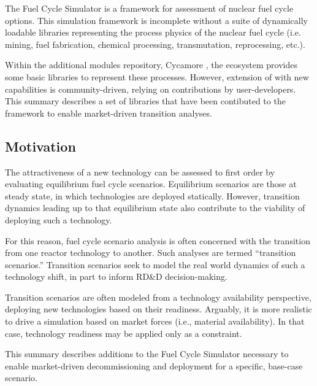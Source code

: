 
The \Cyclus Fuel Cycle Simulator \cite{carlsen_cyclus_2014} is a framework for 
assessment of nuclear fuel cycle options. This simulation framework is 
incomplete without a suite of dynamically loadable libraries representing the 
process physics of the nuclear fuel cycle (i.e. mining, fuel fabrication, 
chemical processing, transmutation, reprocessing, etc.).  

Within the additional modules repository, Cycamore 
\cite{carlsen_cycamore_2014}, the \Cyclus ecosystem provides some basic 
libraries to represent these processes. However, extension of \Cyclus with new 
capabilities is community-driven, relying on contributions by user-developers.  
This summary describes a set of libraries that have been contibuted to the 
\Cyclus framework to enable market-driven transition analyses. 

\subsection{Motivation}

The attractiveness of a new technology can be assessed to first order by 
evaluating equilibrium fuel cycle scenarios. Equilibrium scenarios are those 
at steady state, in which technologies are deployed statically. However, 
transition dynamics leading up to that equilibrium state also contribute to 
the viability of deploying such a technology.  

For this reason, fuel cycle scenario analysis is often concerned with the 
transition from one reactor technology to another. Such analyses are termed 
``transition scenarios.''  Transition scenarios seek to model the real world 
dynamics of such a technology shift, in part to inform RD\&D decision-making. 

Transition scenarios are often modeled from a technology availability 
perspective, deploying new technologies based on their readiness.  Arguably, it 
is more realistic to drive a simulation based on market forces (i.e., material 
availability). In that case, technology readiness may be applied only as a 
constraint. 

This summary describes additions to the \Cyclus Fuel Cycle Simulator necessary 
to enable market-driven decommissioning and deployment for a specific, 
base-case scenario.  

